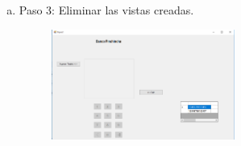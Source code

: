 \begin{enumerate}[1.]
\begin{enumerate}[a)]
\begin{figure}[H]
\begin{center}
		\end{center}
		\end{figure}
	\item Paso 3: Eliminar las vistas creadas.
		\begin{figure}[H]
		\begin{center}
		\includegraphics[width=6cm]{./Imagenes/img11}
		\end{center}
		\end{figure}
	\end{enumerate}




\end{enumerate}
